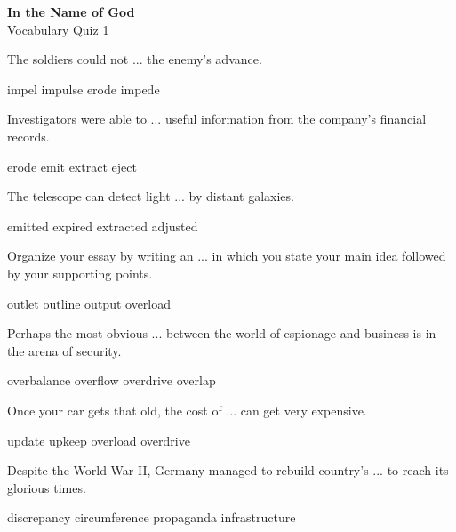 \documentclass{exam}
\begin{document}
\begin{center}
\textbf{In the Name of God}\\ 
Vocabulary Quiz 1
\end{center}
\vspace{5mm}
\begin{questions}



\question The soldiers could not ... the enemy's advance.\\
\begin{oneparchoices}
 \choice impel
 \choice impulse
 \choice erode 
 \correctchoice impede
\end{oneparchoices}

\question Investigators were able to ... useful information from the company's financial records.\\
\begin{oneparchoices}
 \choice erode
 \choice emit
 \correctchoice extract
 \choice eject
\end{oneparchoices}
\question The telescope can detect light ... by distant galaxies.\\
\begin{oneparchoices}
 \correctchoice emitted
 \choice expired 
 \choice extracted
 \choice adjusted
\end{oneparchoices}
\question Organize your essay by writing an ... in which you state your main idea followed by your supporting points.\\
\begin{oneparchoices}
\choice outlet
 \correctchoice outline
 \choice output
 \choice overload 
\end{oneparchoices}
\question Perhaps the most obvious ... between the world of espionage and business is in the arena of security.\\
\begin{oneparchoices}
\choice overbalance
 \choice overflow
 \choice overdrive
 \correctchoice overlap
\end{oneparchoices}
\question Once your car gets that old, the cost of ... can get very expensive.\\
\begin{oneparchoices}
\choice update 
\correctchoice upkeep
 \choice overload
 \choice overdrive 
\end{oneparchoices}

\question Despite the World War II, Germany managed to rebuild country's ... to reach its glorious times.\\
\begin{oneparchoices}
 \choice discrepancy
 \choice circumference
 \choice propaganda
 \correctchoice infrastructure
\end{oneparchoices}




\end{questions}
\end{document}

